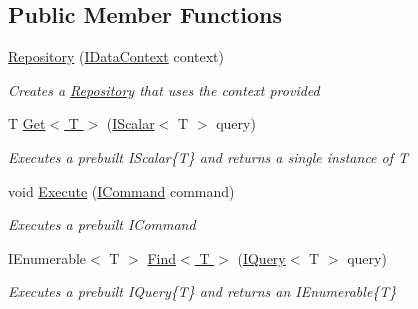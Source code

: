 \subsection*{Public Member Functions}
\begin{DoxyCompactItemize}
\item 
\hyperlink{class_highway_1_1_data_1_1_repository_a389f626c975fba670445d97b9ae780c2}{Repository} (\hyperlink{interface_highway_1_1_data_1_1_interfaces_1_1_i_data_context}{I\-Data\-Context} context)
\begin{DoxyCompactList}\small\item\em Creates a \hyperlink{class_highway_1_1_data_1_1_repository}{Repository} that uses the context provided \end{DoxyCompactList}\item 
T \hyperlink{class_highway_1_1_data_1_1_repository_a45937217fa900c48979c8eec90b8db1b}{Get$<$ T $>$} (\hyperlink{interface_highway_1_1_data_1_1_interfaces_1_1_i_scalar-g}{I\-Scalar}$<$ T $>$ query)
\begin{DoxyCompactList}\small\item\em Executes a prebuilt I\-Scalar\{\-T\} and returns a single instance of {\itshape T}  \end{DoxyCompactList}\item 
void \hyperlink{class_highway_1_1_data_1_1_repository_aa09c537b268e6e96085803087f9f7212}{Execute} (\hyperlink{interface_highway_1_1_data_1_1_interfaces_1_1_i_command}{I\-Command} command)
\begin{DoxyCompactList}\small\item\em Executes a prebuilt I\-Command \end{DoxyCompactList}\item 
I\-Enumerable$<$ T $>$ \hyperlink{class_highway_1_1_data_1_1_repository_ab19e6b78b2aa9394f45194f4c8761ff1}{Find$<$ T $>$} (\hyperlink{interface_highway_1_1_data_1_1_interfaces_1_1_i_query-g}{I\-Query}$<$ T $>$ query)
\begin{DoxyCompactList}\small\item\em Executes a prebuilt I\-Query\{\-T\} and returns an I\-Enumerable\{\-T\} \end{DoxyCompactList}\end{DoxyCompactItemize}
